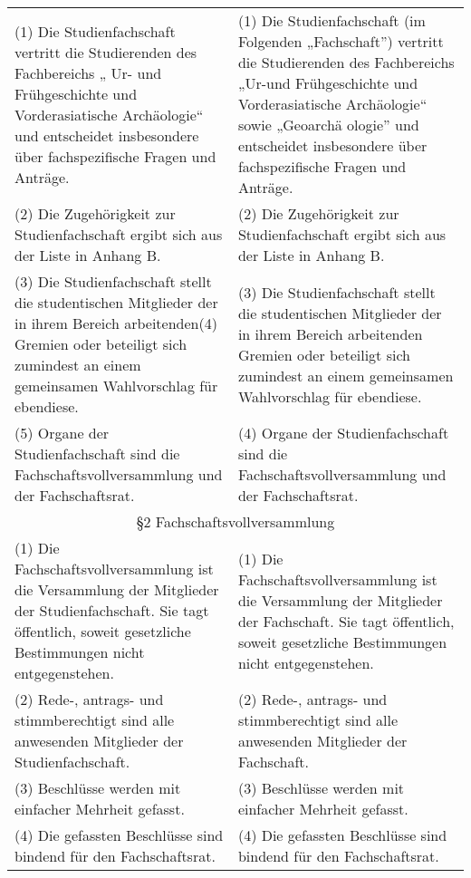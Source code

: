 {\begin{longtable}{|p{7.5cm}|p{7.5cm}|}
        (1)  Die Studienfachschaft vertritt die Studierenden des Fachbereichs „ Ur-
        und  Frühgeschichte und Vorderasiatische Archäologie“ und entscheidet insbesondere
        über fachspezifische Fragen und Anträge.&
        (1)  Die Studienfachschaft (im Folgenden „Fachschaft”) vertritt die Studierenden des
        Fachbereichs „Ur-und Frühgeschichte und Vorderasiatische Archäologie“ sowie „Geoarchä
        ologie” und entscheidet insbesondere über fachspezifische Fragen und Anträge.\\
        (2)  Die Zugehörigkeit zur Studienfachschaft ergibt sich aus der Liste in
        Anhang B.&
        (2)  Die Zugehörigkeit zur Studienfachschaft ergibt sich aus der Liste in Anhang B.\\
        (3)  Die Studienfachschaft stellt die studentischen Mitglieder der in ihrem
        Bereich arbeitenden\newline (4) Gremien oder beteiligt sich zumindest an einem gemeinsamen
        Wahlvorschlag für ebendiese. &
        (3)  Die Studienfachschaft stellt die studentischen Mitglieder der in ihrem Bereich
        arbeitenden Gremien oder beteiligt sich zumindest an einem gemeinsamen Wahlvorschlag
        für ebendiese.\\
        (5) Organe der Studienfachschaft sind die Fachschaftsvollversammlung und der
        Fachschaftsrat. &
        (4)  Organe der Studienfachschaft sind die Fachschaftsvollversammlung und der
        Fachschaftsrat.\\
        \multicolumn{2}{|c|}{§2 Fachschaftsvollversammlung}\\\hline
        (1)  Die Fachschaftsvollversammlung ist die Versammlung der Mitglieder der
        Studienfachschaft. Sie tagt öffentlich, soweit gesetzliche Bestimmungen nicht
        entgegenstehen.&
        (1)  Die Fachschaftsvollversammlung ist die Versammlung der Mitglieder der
        Fachschaft.  Sie tagt öffentlich, soweit gesetzliche Bestimmungen nicht
        entgegenstehen.\\
        (2) Rede-, antrags- und stimmberechtigt sind alle anwesenden Mitglieder der
        Studienfachschaft.&
        (2)  Rede-, antrags- und stimmberechtigt sind alle anwesenden Mitglieder der
        Fachschaft. \\
        (3)  Beschlüsse werden mit einfacher Mehrheit gefasst.&
        (3)  Beschlüsse werden mit einfacher Mehrheit gefasst.\\
        (4)  Die gefassten Beschlüsse sind bindend für den Fachschaftsrat.&
        (4)  Die gefassten Beschlüsse sind bindend für den Fachschaftsrat.\\

\end{longtable}}
